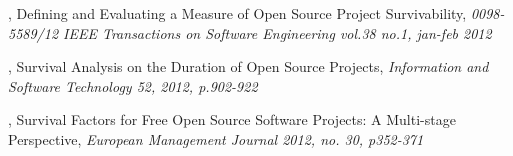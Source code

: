 \begin{thebibliography}{99}
	 \rm, Defining and
		Evaluating a Measure of Open Source Project Survivability, \emph{0098-5589/12
		IEEE Transactions on Software Engineering vol.38 no.1, jan-feb 2012}\rm

\begin{comment}
		Raja and Tretter defined and validated a multidimensional measure of OSS
		project survivability: project viability. This measure has three dimensions:
		vigor, resilience, and organisation. For each of these dimensions they defined
		a viability index. The outcome of the study is that they have been able to
		confirm that vigor, resilience, and organisation are different attributes
		related to project survivability.

		This paper is related to the Master's project in terms of determining whether
		an OSS project is active or dying.
\end{comment}

	 \rm,
		Survival Analysis on the Duration of Open Source Projects, \emph{Information
		and Software Technology 52, 2012, p.902-922}\rm

\begin{comment}
		Samoladas et al. studied survival analysis techniques for estimating the
		future development of a FLOSS project. They used duration data of thousands of
		FLOSS projects from different source code repositories. They have applied
		different survival analysis methods to predict the survivability of the
		projects (i.e., their probability of continuation in the future). They have
		used the application domain and number of committers as metrics that affect
		duration.

		This paper is related to this project on the analysis of project survivability
		measures. It can be used to validate the results found by wavelet analysis.
\end{comment}
	
	 \rm, Survival Factors for Free Open
		Source Software Projects: A Multi-stage Perspective, \emph{European Management
		Journal 2012, no. 30, p352-371}\rm

\begin{comment}
		Wang uses a large data set of free OSS projects (FOSS) obtained from
		SourceForge.net to investigate survival factors at two stages of the project
		life-cycle. The first stage being the initial stage, before the first release.
		The second stage is the growth stage, after the first release. The factors for
		survival are slightly different in each stage. Wang has found that there are
		in general many factors that influence survivability of FOSS projects. Six
		factors are of particular interest: developer participation effort, developer
		service quality, software license restrictiveness, targeted users, community
		social network ties, and community quality of social ties. These six were
		chosen as these have the most influence on FOSS project success and the data
		of these factors is widely available.
		

\end{comment}
\end{thebibliography}
